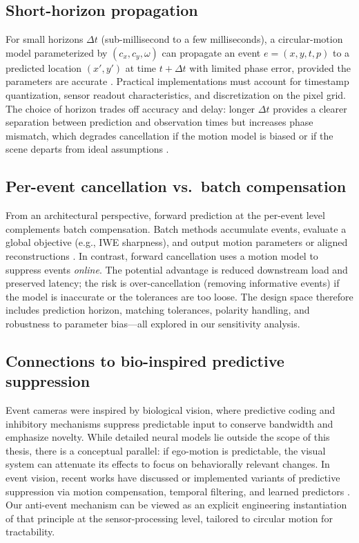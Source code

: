 \subsection{Short-horizon propagation}
For small horizons $\Delta t$ (sub-millisecond to a few milliseconds), a circular-motion model parameterized by $(c_x,c_y,\omega)$ can propagate an event $e=(x,y,t,p)$ to a predicted location $(x',y')$ at time $t+\Delta t$ with limited phase error, provided the parameters are accurate \cite{Gallego2017Angular}. Practical implementations must account for timestamp quantization, sensor readout characteristics, and discretization on the pixel grid. The choice of horizon trades off accuracy and delay: longer $\Delta t$ provides a clearer separation between prediction and observation times but increases phase mismatch, which degrades cancellation if the motion model is biased or if the scene departs from ideal assumptions \cite{Gallego2018CMax}.

\subsection{Per-event cancellation vs.\ batch compensation}
From an architectural perspective, forward prediction at the per-event level complements batch compensation. Batch methods accumulate events, evaluate a global objective (e.g., IWE sharpness), and output motion parameters or aligned reconstructions \cite{Bardow2016SOFIE,Gallego2018CMax}. In contrast, forward cancellation uses a motion model to suppress events \emph{online}. The potential advantage is reduced downstream load and preserved latency; the risk is over-cancellation (removing informative events) if the model is inaccurate or the tolerances are too loose. The design space therefore includes prediction horizon, matching tolerances, polarity handling, and robustness to parameter bias—all explored in our sensitivity analysis.

\subsection{Connections to bio-inspired predictive suppression}
Event cameras were inspired by biological vision, where predictive coding and inhibitory mechanisms suppress predictable input to conserve bandwidth and emphasize novelty. While detailed neural models lie outside the scope of this thesis, there is a conceptual parallel: if ego-motion is predictable, the visual system can attenuate its effects to focus on behaviorally relevant changes. In event vision, recent works have discussed or implemented variants of predictive suppression via motion compensation, temporal filtering, and learned predictors \cite{Gallego2020Survey}. Our anti-event mechanism can be viewed as an explicit engineering instantiation of that principle at the sensor-processing level, tailored to circular motion for tractability.

